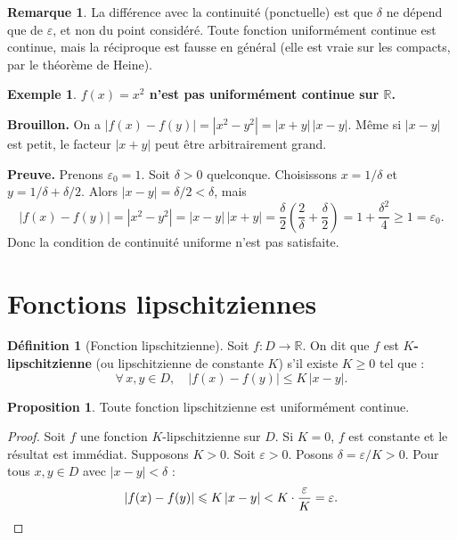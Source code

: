 \documentclass[12pt,a4paper,openany]{book}
\theoremstyle{definition}
\newtheorem{definition}{Définition}[chapter]
\newtheorem{proposition}{Proposition}[chapter]
\newtheorem{remarque}{Remarque}[chapter]
\newtheorem{exemple}{Exemple}[chapter]
\newcommand{\R}{\mathbb{R}}
\begin{document}
\begin{remarque}\label{rem:unif-vs-ponctuelle}
La différence avec la continuité (ponctuelle) est que $\delta$ ne dépend que de $\varepsilon$, et non du point considéré. Toute fonction uniformément continue est continue, mais la réciproque est fausse en général (elle est vraie sur les compacts, par le théorème de Heine).
\end{remarque}

\begin{exemple}\label{ex:x2-non-unif}
\textbf{$f(x) = x^2$ n'est pas uniformément continue sur $\R$.}

\medskip
\textbf{Brouillon.} On a $|f(x) - f(y)| = |x^2 - y^2| = |x+y|\,|x-y|$. Même si $|x-y|$ est petit, le facteur $|x+y|$ peut être arbitrairement grand.

\medskip
\textbf{Preuve.} Prenons $\varepsilon_0 = 1$. Soit $\delta > 0$ quelconque. Choisissons $x = 1/\delta$ et $y = 1/\delta + \delta/2$. Alors $|x - y| = \delta/2 < \delta$, mais
\[
  |f(x) - f(y)| = |x^2 - y^2| = |x - y|\,|x + y|
  = \frac{\delta}{2}\left(\frac{2}{\delta} + \frac{\delta}{2}\right)
  = 1 + \frac{\delta^2}{4} \geqslant 1 = \varepsilon_0.
\]
Donc la condition de continuité uniforme n'est pas satisfaite.
\end{exemple}

\section{Fonctions lipschitziennes}\label{sec:lipschitz}

\begin{definition}[Fonction lipschitzienne]\label{def:lipschitz}
Soit $f \colon D \to \R$. On dit que $f$ est \textbf{$K$-lipschitzienne} (ou lipschitzienne de constante $K$) s'il existe $K \geqslant 0$ tel que :
\[
  \forall\, x, y \in D,\quad |f(x) - f(y)| \leqslant K\,|x - y|.
\]
\end{definition}

\begin{proposition}\label{prop:lipschitz-unif}
Toute fonction lipschitzienne est uniformément continue.
\end{proposition}

\begin{proof}
Soit $f$ une fonction $K$-lipschitzienne sur $D$. Si $K = 0$, $f$ est constante et le résultat est immédiat. Supposons $K > 0$. Soit $\varepsilon > 0$. Posons $\delta = \varepsilon/K > 0$. Pour tous $x, y \in D$ avec $|x - y| < \delta$ :
\[
  |f(x) - f(y)| \leqslant K\,|x - y| < K \cdot \frac{\varepsilon}{K} = \varepsilon. \qedhere
\]
\end{proof}
\end{document}
